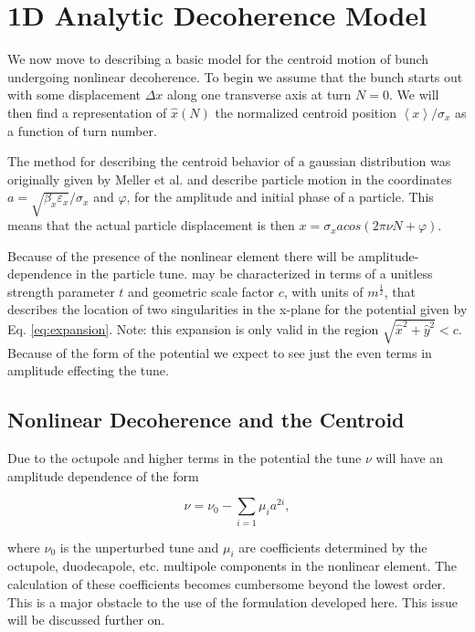 \documentclass[aps,prstab,twocolumn, groupedaddress]{revtex4-1}
\begin{document}
\section{1D Analytic Decoherence Model}
We now move to describing a basic model for the centroid motion of bunch undergoing 
nonlinear decoherence. To begin we assume that the bunch starts out with some 
displacement $\Delta x$ along one transverse axis at turn $N=0$. We will then find a 
representation of  $\hat{x}(N)$ the normalized centroid position $\left\langle x 
\right\rangle 
/ \sigma_x$ as a function of turn number. 

The method for describing the centroid behavior of a gaussian distribution was originally 
given by Meller et al. \cite{meller} and describe particle motion in the coordinates $ a = 
\sqrt{\beta_x \varepsilon_x} / \sigma_x$ and $\varphi$, for the amplitude and initial phase 
of a 
particle. This means that the actual particle displacement is then $x = \sigma_x a cos(2 \pi 
\nu N + \varphi)$. 

Because of the presence of the nonlinear element there will be amplitude-dependence in 
the particle tune. may be characterized in terms of
a unitless strength parameter $t$ and geometric scale factor $c$, with units of
$m^\frac{1}{2}$, that describes the location of two singularities in the x-plane for the 
potential given by Eq. \ref{eq:expansion}. 
Note: this expansion is only valid in the region $\sqrt{\hat{x}^2 +\hat{y}^2} < c$. Because 
of the form of the potential we expect to see just the even 
terms in amplitude effecting the tune.

\subsection{Nonlinear Decoherence and the Centroid}

Due to the octupole and higher terms in the potential the tune $\nu$ will have an 
amplitude dependence of the form

\begin{equation} \label{eq:tune}
\nu = \nu_0 - \sum_{i=1} \mu_i a^{2i},
\end{equation}

where $\nu_0$ is the unperturbed tune and $\mu_i$ are coefficients determined by the 
octupole, duodecapole, etc. multipole components in the nonlinear element. The 
calculation of these coefficients becomes cumbersome beyond the lowest order. This is a 
major obstacle to the use of the formulation developed here. This issue will be discussed 
further on.
\end{document}
